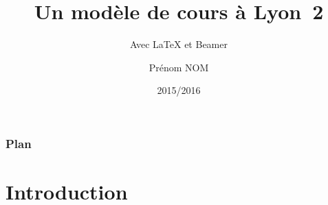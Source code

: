 \documentclass[10pt,t]{beamer}
\title{Un modèle de cours à Lyon~2}
\subtitle{Avec \LaTeX{} et Beamer}
\author{Prénom NOM}
\institute{Université Lyon~2}
\date{2015/2016}
\begin{document}
\maketitle[label=titre]

\begin{frame}
  \frametitle{Plan}
  \tableofcontents %
\end{frame}


\section*{Introduction}

\end{document}
